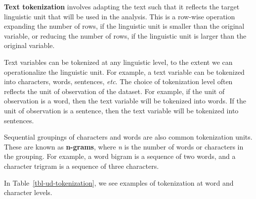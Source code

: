 \documentclass[
  letterpaper,
  DIV=11,
  numbers=noendperiod]{scrreprt}
\theoremstyle{definition}
\theoremstyle{remark}
\begin{document}
\textbf{Text tokenization} involves adapting the text such that it
reflects the target linguistic unit that will be used in the analysis.
This is a row-wise operation expanding the number of rows, if the
linguistic unit is smaller than the original variable, or reducing the
number of rows, if the linguistic unit is larger than the original
variable.

Text variables can be tokenized at any linguistic level, to the extent
we can operationalize the linguistic unit. For example, a text variable
can be tokenized into characters, words, sentences, \emph{etc}. The
choice of tokenization level often reflects the unit of observation of
the dataset. For example, if the unit of observation is a word, then the
text variable will be tokenized into words. If the unit of observation
is a sentence, then the text variable will be tokenized into sentences.

Sequential groupings of characters and words are also common
tokenization units. These are known as \textbf{n-grams}, where \emph{n}
is the number of words or characters in the grouping. For example, a
word bigram is a sequence of two words, and a character trigram is a
sequence of three characters.

In Table~\ref{tbl-ud-tokenization}, we see examples of tokenization at
word and character levels.
\end{document}
